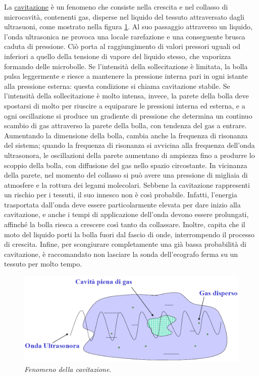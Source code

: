 \documentclass{report}
\newcommand{\figref}[1]{figura \ref{#1}}
\numberwithin{equation}{section}
\numberwithin{figure}{section}
\begin{document}
La \underline{cavitazione} è un fenomeno che consiste nella crescita e nel collasso di microcavità, contenenti gas, disperse nel liquido del tessuto attraversato dagli ultrasuoni, come mostrato nella \figref{fig:cavitazione}. Al suo passaggio attraverso un liquido, l'onda ultrasonica ne provoca una locale rarefazione e una conseguente brusca caduta di pressione. Ciò porta al raggiungimento di valori pressori uguali od inferiori a quello della tensione di vapore del liquido stesso, che vaporizza formando delle microbolle. Se l’intensità della sollecitazione è limitata, la bolla pulsa leggermente e riesce a mantenere la pressione interna pari in ogni istante alla pressione esterna: questa condizione si chiama cavitazione stabile. Se l’intensità della sollecitazione è molto intensa, invece, la parete della bolla deve spostarsi di molto per riuscire a equiparare le pressioni interna ed esterna, e a ogni oscillazione si produce un gradiente di pressione che determina un continuo scambio di gas attraverso la parete della bolla, con tendenza del gas a entrare. Aumentando la dimensione della bolla, cambia anche la frequenza di risonanza del sistema; quando la frequenza di risonanza si avvicina alla frequenza dell'onda ultrasonora, le oscillazioni della parete aumentano di ampiezza fino a produrre lo scoppio della bolla, con diffusione del gas nello spazio circostante. In vicinanza della parete, nel momento del collasso si può avere una pressione di migliaia di atmosfere e la rottura dei legami molecolari. Sebbene la cavitazione rappresenti un rischio per i tessuti, il suo innesco non è così probabile. Infatti, l'energia trasportata dall'onda deve essere particolarmente elevata per dare inizio alla cavitazione, e anche i tempi di applicazione dell'onda devono essere prolungati, affinché la bolla riesca a crescere così tanto da collassare. Inoltre, capita che il moto del liquido porti la bolla fuori dal fascio di onde, interrompendo il processo di crescita. Infine, per scongiurare completamente una già bassa probabilità di cavitazione, è raccomandato non lasciare la sonda dell'ecografo ferma su un tessuto per molto tempo.

\begin{figure}[htp]
\centering
\includegraphics[scale=0.6]{immagini/cavitazione.png}
\caption{\label{fig:cavitazione} \textit{Fenomeno della cavitazione}.}
\end{figure}
\end{document}

